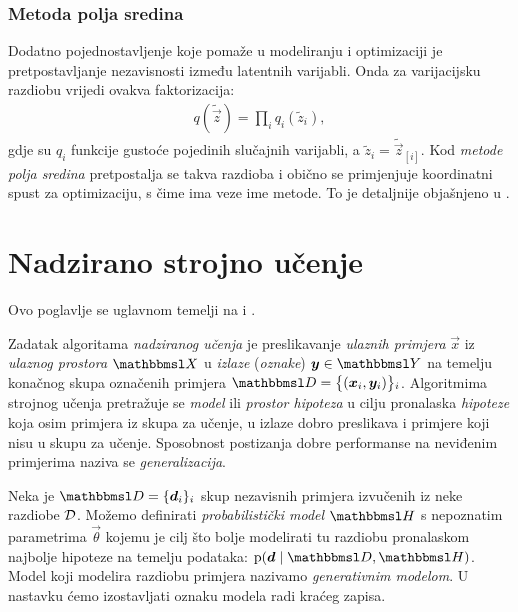 \documentclass[utf8, diplomski, lmodern]{fer}
\begin{document}
\subsection{Metoda polja sredina}

Dodatno pojednostavljenje koje pomaže u modeliranju i optimizaciji je pretpostavljanje nezavisnosti između latentnih varijabli. Onda za varijacijsku razdiobu vrijedi ovakva faktorizacija:
\begin{align}
q(\tilde{\vec z}) = \prod_i q_i(\tilde{z}_i),
\end{align}
gdje su $q_i$ funkcije gustoće pojedinih slučajnih varijabli, a $\tilde{z}_i=\tilde{\vec z}_{[i]}$. Kod \emph{metode polja sredina} pretpostalja se takva razdioba i obično se primjenjuje koordinatni spust za optimizaciju, s čime ima veze ime metode. To je detaljnije objašnjeno u \citet{Murphy:2012:MLPP}.

\iffalse
Neka je, radi kraćeg zapisa, $t(\tilde{\vec z}) \coloneqq \p(\rvec z=\tilde{\vec z},\rvec x=\vec x)$. Uz aproksimaciju polja sredina donja varijacijska granica postaje
\begin{align}
L_{\vec x}(\tilde{\rvec z}) 
&= \E_{\tilde{\rvec z}}\sbr{\ln t(\tilde{\vec z}) - \ln q(\tilde{\vec z})}
\\
&= \int\dif{\tilde{\vec z}} \del{\prod_i q_i(\tilde{z}_i)}\del{\ln t(\tilde{\vec z}) - \sum_j \ln q_j(\tilde{z}_j)}
\text{.}
\end{align}
\fi



\chapter{Nadzirano strojno učenje} \label{chap:nsu}

Ovo poglavlje se uglavnom temelji na \citet{Snajder:2014:SU} i \citet{Goodfellow:2016:DL}.

Zadatak algoritama \emph{nadziranog učenja} je preslikavanje \emph{ulaznih primjera} $\vec x$ iz \emph{ulaznog prostora} $\set{X}$ u \emph{izlaze} (\emph{oznake}) $\vec y\in\set{Y}$ na temelju konačnog skupa označenih primjera $\set{D} = \cbr{\del{\vec x_i,\vec y_i}}_{i}$. Algoritmima strojnog učenja pretražuje se \emph{model} ili \emph{prostor hipoteza} u cilju pronalaska \emph{hipoteze} koja osim primjera iz skupa za učenje, u izlaze dobro preslikava i primjere koji nisu u skupu za učenje. Sposobnost postizanja dobre performanse na neviđenim primjerima naziva se \emph{generalizacija}.

Neka je $\set{D}=\cbr{\vec d_i}_i$ skup nezavisnih primjera izvučenih iz neke razdiobe $\mathcal{D}$. Možemo definirati \emph{probabilistički model} $\set H$ s nepoznatim parametrima $\vec\theta$ kojemu je cilj što bolje modelirati tu razdiobu pronalaskom najbolje hipoteze na temelju podataka: $\p(\vec{d}\mid\set{D},\set H)$. Model koji modelira razdiobu primjera nazivamo \emph{generativnim modelom}. U nastavku ćemo izostavljati oznaku modela radi kraćeg zapisa.
\end{document}
